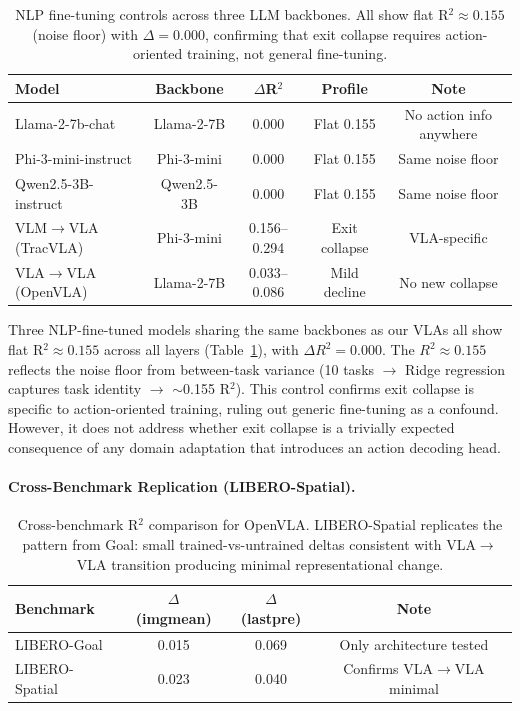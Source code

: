 \documentclass[letterpaper]{article}
\begin{document}
\begin{table}[h]
\centering
\caption{NLP fine-tuning controls across three LLM backbones. All show flat R$^2 \approx 0.155$ (noise floor) with $\Delta = 0.000$, confirming that exit collapse requires action-oriented training, not general fine-tuning.}
\label{tab:nlp_control}
\begin{tabular}{lcccc}
\toprule
Model & Backbone & $\Delta$R$^2$ & Profile & Note \\
\midrule
Llama-2-7b-chat & Llama-2-7B & 0.000 & Flat 0.155 & No action info anywhere \\
Phi-3-mini-instruct & Phi-3-mini & 0.000 & Flat 0.155 & Same noise floor \\
Qwen2.5-3B-instruct & Qwen2.5-3B & 0.000 & Flat 0.155 & Same noise floor \\
\midrule
VLM$\to$VLA (TracVLA) & Phi-3-mini & 0.156--0.294 & Exit collapse & VLA-specific \\
VLA$\to$VLA (OpenVLA) & Llama-2-7B & 0.033--0.086 & Mild decline & No new collapse \\
\bottomrule
\end{tabular}
\end{table}

Three NLP-fine-tuned models sharing the same backbones as our VLAs all show flat R$^2 \approx 0.155$ across all layers (Table~\ref{tab:nlp_control}), with $\Delta R^2 = 0.000$. The $R^2 \approx 0.155$ reflects the noise floor from between-task variance (10 tasks $\to$ Ridge regression captures task identity $\to$ $\sim$0.155 R$^2$). This control confirms exit collapse is specific to action-oriented training, ruling out generic fine-tuning as a confound. However, it does not address whether exit collapse is a trivially expected consequence of any domain adaptation that introduces an action decoding head.

\paragraph{Cross-Benchmark Replication (LIBERO-Spatial).}

\begin{table}[h]
\centering
\caption{Cross-benchmark R$^2$ comparison for OpenVLA. LIBERO-Spatial replicates the pattern from Goal: small trained-vs-untrained deltas consistent with VLA$\to$VLA transition producing minimal representational change.}
\label{tab:cross_benchmark}
\begin{tabular}{lccc}
\toprule
Benchmark & $\Delta$ (imgmean) & $\Delta$ (lastpre) & Note \\
\midrule
LIBERO-Goal & 0.015 & 0.069 & Only architecture tested \\
LIBERO-Spatial & 0.023 & 0.040 & Confirms VLA$\to$VLA minimal \\
\bottomrule
\end{tabular}
\end{table}
\end{document}
